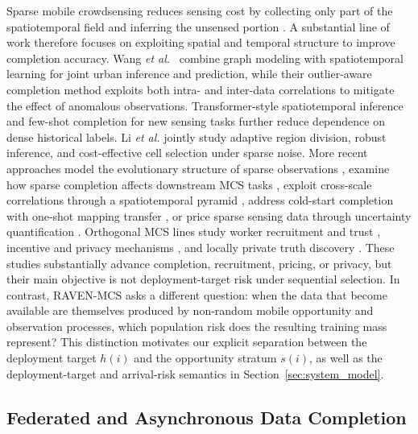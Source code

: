 \documentclass[letterpaper,journal]{IEEEtran}
\begin{document}
Sparse mobile crowdsensing reduces sensing cost by collecting only part of the
spatiotemporal field and inferring the unsensed portion
\cite{ganti2011mobile,guo2015mobile,ma2014opportunities}.  A substantial line of
work therefore focuses on exploiting spatial and temporal structure to improve
completion accuracy.  Wang \emph{et al.}~\cite{wang2023spatiotemporal} combine
graph modeling with spatiotemporal learning for joint urban inference and
prediction, while their outlier-aware completion method
\cite{wang2023outlier} exploits both intra- and inter-data correlations to
mitigate the effect of anomalous observations.  Transformer-style
spatiotemporal inference \cite{wang2023transformer} and few-shot completion for
new sensing tasks \cite{wang2024fewshot} further reduce dependence on dense
historical labels.  Li \emph{et al.}
\cite{li2024robust} jointly study adaptive region division, robust inference,
and cost-effective cell selection under sparse noise.  More recent approaches
model the evolutionary structure of sparse observations
\cite{wang2025evolutionary}, examine how sparse completion affects downstream
MCS tasks \cite{xu2025rethinking}, exploit cross-scale correlations through
a spatiotemporal pyramid \cite{liu2026pyramid}, address cold-start completion
with one-shot mapping transfer \cite{zhang2026mapt}, or price sparse sensing
data through uncertainty quantification \cite{liu2026pricing}.
Orthogonal MCS lines study worker recruitment and trust
\cite{liu2026multidimensional}, incentive and privacy mechanisms
\cite{zhang2025incentive,lu2025piece}, and locally private truth discovery
\cite{zhang2026locally}.  These studies substantially
advance completion, recruitment, pricing, or privacy, but their main objective
is not deployment-target risk under sequential selection.
In contrast, RAVEN-MCS asks a different question: when the data that become
available are themselves produced by non-random mobile opportunity and
observation processes, which population risk does the resulting training mass
represent?  This distinction motivates our explicit separation between the
deployment target $h(i)$ and the opportunity stratum $s(i)$, as well as the
deployment-target and arrival-risk semantics in Section~\ref{sec:system_model}.

\subsection{Federated and Asynchronous Data Completion}
\end{document}
